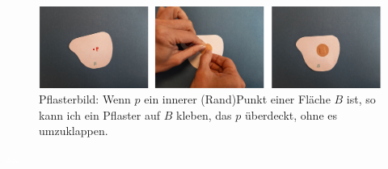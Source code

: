     \begin{figure}[ht]
        \centering
        \includegraphics[width=\textwidth]{bearbeitet-22-04-25/pflasterbild-innerer-pkt.png}
        \caption[Pflasterbild: innerer Punkt]{Pflasterbild: Wenn $p$ ein innerer (Rand)Punkt einer Fläche $B$ ist, so kann ich ein Pflaster auf $B$ kleben, das $p$ überdeckt, ohne es umzuklappen.}
        \label{fig:pflasterbild-innerer-pkt}
    \end{figure}
    
    \textcolor{white}{xx}


    

    

